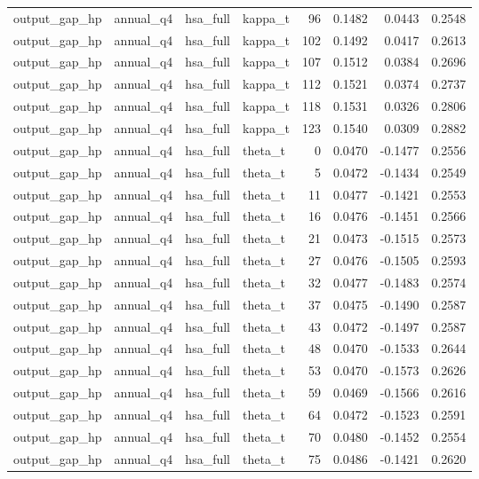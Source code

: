 \begin{tabular}{llllrrrr}
output\_gap\_hp & annual\_q4 & hsa\_full & kappa\_t & 96 & 0.1482 & 0.0443 & 0.2548 \\
output\_gap\_hp & annual\_q4 & hsa\_full & kappa\_t & 102 & 0.1492 & 0.0417 & 0.2613 \\
output\_gap\_hp & annual\_q4 & hsa\_full & kappa\_t & 107 & 0.1512 & 0.0384 & 0.2696 \\
output\_gap\_hp & annual\_q4 & hsa\_full & kappa\_t & 112 & 0.1521 & 0.0374 & 0.2737 \\
output\_gap\_hp & annual\_q4 & hsa\_full & kappa\_t & 118 & 0.1531 & 0.0326 & 0.2806 \\
output\_gap\_hp & annual\_q4 & hsa\_full & kappa\_t & 123 & 0.1540 & 0.0309 & 0.2882 \\
output\_gap\_hp & annual\_q4 & hsa\_full & theta\_t & 0 & 0.0470 & -0.1477 & 0.2556 \\
output\_gap\_hp & annual\_q4 & hsa\_full & theta\_t & 5 & 0.0472 & -0.1434 & 0.2549 \\
output\_gap\_hp & annual\_q4 & hsa\_full & theta\_t & 11 & 0.0477 & -0.1421 & 0.2553 \\
output\_gap\_hp & annual\_q4 & hsa\_full & theta\_t & 16 & 0.0476 & -0.1451 & 0.2566 \\
output\_gap\_hp & annual\_q4 & hsa\_full & theta\_t & 21 & 0.0473 & -0.1515 & 0.2573 \\
output\_gap\_hp & annual\_q4 & hsa\_full & theta\_t & 27 & 0.0476 & -0.1505 & 0.2593 \\
output\_gap\_hp & annual\_q4 & hsa\_full & theta\_t & 32 & 0.0477 & -0.1483 & 0.2574 \\
output\_gap\_hp & annual\_q4 & hsa\_full & theta\_t & 37 & 0.0475 & -0.1490 & 0.2587 \\
output\_gap\_hp & annual\_q4 & hsa\_full & theta\_t & 43 & 0.0472 & -0.1497 & 0.2587 \\
output\_gap\_hp & annual\_q4 & hsa\_full & theta\_t & 48 & 0.0470 & -0.1533 & 0.2644 \\
output\_gap\_hp & annual\_q4 & hsa\_full & theta\_t & 53 & 0.0470 & -0.1573 & 0.2626 \\
output\_gap\_hp & annual\_q4 & hsa\_full & theta\_t & 59 & 0.0469 & -0.1566 & 0.2616 \\
output\_gap\_hp & annual\_q4 & hsa\_full & theta\_t & 64 & 0.0472 & -0.1523 & 0.2591 \\
output\_gap\_hp & annual\_q4 & hsa\_full & theta\_t & 70 & 0.0480 & -0.1452 & 0.2554 \\
output\_gap\_hp & annual\_q4 & hsa\_full & theta\_t & 75 & 0.0486 & -0.1421 & 0.2620 \\

\end{tabular}
